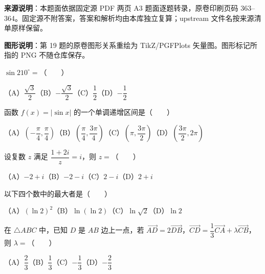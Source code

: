 


\begin{gktip}
\textbf{来源说明}：本题面依据固定源 PDF 两页 A3 题面逐题转录，原卷印刷页码 363–364。固定源不附答案，答案和解析均由本库独立复算；upstream 文件名按来源清单原样保留。

\textbf{图形说明}：第 19 题的原卷图形关系重绘为 TikZ/PGFPlots 矢量图。图形标记所指的 PNG 不随仓库保存。
\end{gktip}


\begin{question}
$\sin210^\circ=$\mbox{（　　）}

（A）$\dfrac{\sqrt3}{2}$\quad（B）$-\dfrac{\sqrt3}{2}$\quad（C）$\dfrac12$\quad（D）$-\dfrac12$

\end{question}
\begin{question}
函数 $f(x)=|\sin x|$ 的一个单调递增区间是\mbox{（　　）}

（A）$\left(-\dfrac\pi4,\dfrac\pi4\right)$\quad（B）$\left(\dfrac\pi4,\dfrac{3\pi}4\right)$\quad（C）$\left(\pi,\dfrac{3\pi}2\right)$\quad（D）$\left(\dfrac{3\pi}2,2\pi\right)$

\end{question}
\begin{question}
设复数 $z$ 满足 $\dfrac{1+2i}{z}=i$，则 $z=$\mbox{（　　）}

（A）$-2+i$\quad（B）$-2-i$\quad（C）$2-i$\quad（D）$2+i$

\end{question}
\begin{question}
以下四个数中的最大者是\mbox{（　　）}

（A）$(\ln2)^2$\quad（B）$\ln(\ln2)$\quad（C）$\ln\sqrt2$\quad（D）$\ln2$

\end{question}
\begin{question}
在 $\triangle ABC$ 中，已知 $D$ 是 $AB$ 边上一点，若 $\overrightarrow{AD}=2\overrightarrow{DB}$，$\overrightarrow{CD}=\dfrac13\overrightarrow{CA}+\lambda\overrightarrow{CB}$，则 $\lambda=$\mbox{（　　）}

（A）$\dfrac23$\quad（B）$\dfrac13$\quad（C）$-\dfrac13$\quad（D）$-\dfrac23$

\end{question}
